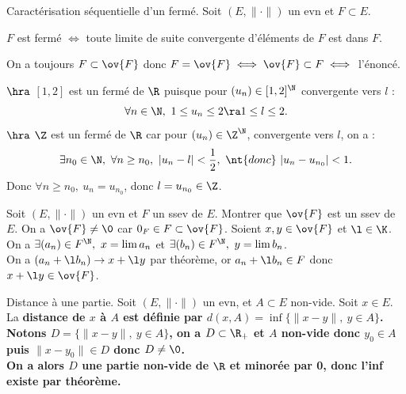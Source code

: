 \documentclass[11pt]{article}
\begin{document}
\vspace*{-0.4cm}

\begin{corr}{Caractérisation séquentielle d'un fermé.}{}
    Soit $(E,\|\cdot\|)$ un evn et $F\subset E$.
    \begin{center}
        $F$ est fermé $\iff$ toute limite de suite convergente d'éléments de $F$ est dans $F$.
    \end{center}
    \tcblower
    On a toujours $F\subset\ov{F}$ donc $F=\ov{F} \iff \ov{F} \subset F \iff $ l'énoncé.
\end{corr}

\vspace*{-0.4cm}

\begin{ex}{}{}
    $\hra$ $[1,2]$ est un fermé de $\R$ puisque pour $(u_n)\in[1,2]^\N$ convergente vers $l$ :
    \begin{equation*}
        \forall n \in \N, ~ 1 \leq u_n \leq 2 \ra 1 \leq l \leq 2.
    \end{equation*}
    $\hra$ $\Z$ est un fermé de $\R$ car pour $(u_n)\in\Z^\N$, convergente vers $l$, on a :
    \begin{equation*}
        \exists n_0 \in \N, ~ \forall n \geq n_0, ~ |u_n-l| <\frac{1}{2}, ~ \nt{donc} ~ |u_n - u_{n_0}| < 1.
    \end{equation*}
    Donc $\forall n \geq n_0, ~ u_n = u_{n_0}$, donc $l=u_{n_0}\in\Z$.
\end{ex}

\vspace*{-0.4cm}

\begin{ex}{}{}
    Soit $(E,\|\cdot\|)$ un evn et $F$ un ssev de $E$. Montrer que $\ov{F}$ est un ssev de $E$.
    \tcblower
    On a $\ov{F}\neq\0$ car $0_F\in F\subset \ov{F}$. Soient $x,y\in \ov{F}$ et $\l\in\K$.\\
    On a $\exists (a_n)\in F^\N, ~ x = \lim a_n$ et $\exists (b_n)\in F^\N, ~ y=\lim b_n$.\\
    On a $(a_n+\l b_n)\to x + \l y$ par théorème, or $a_n+\l b_n \in F$ donc $x+\l y \in \ov{F}$.
\end{ex}

\vspace*{-0.8cm}

\begin{defi}{Distance à une partie.}{}
    Soit $(E,\|\cdot\|)$ un evn, et $A\subset E$ non-vide. Soit $x\in E$.\\
    La \bf{distance} de $x$ à $A$ est définie par $d(x,A)=\inf\{\|x-y\|, ~ y \in A\}$.
    \tcblower
    Notons $D=\{\|x-y\|, ~ y \in A\}$, on a $D\subset\R_+$ et $A$ non-vide donc $y_0\in A$ puis $\|x-y_0\|\in D$ donc $D\neq\0$.\\
    On a alors $D$ une partie non-vide de $\R$ et minorée par 0, donc l'inf existe par théorème. 
\end{defi}
\end{document}
